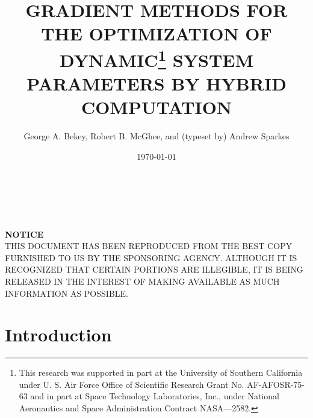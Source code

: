 \documentclass[12pt,reqno]{article}
\title{\textbf{GRADIENT METHODS FOR THE OPTIMIZATION OF DYNAMIC\footnote{This research was supported in part at the University of Southern California under U. S. Air Force Office of Scientific Research Grant No. AF-AFOSR-75-63 and in part at Space Technology Laboratories, Inc., under National Aeronautics and Space Administration Contract NASA—2582.} SYSTEM PARAMETERS BY HYBRID COMPUTATION}} %
\author{George A. Bekey, Robert B. McGhee, and (typeset by) Andrew Sparkes}
\date{\today} %
\begin{document}


\thispagestyle{empty}
\makeatletter
\begin{titlepage}
    \vspace*{\fill}
        \begin{center}
            \@title\\
            \@author\\
            \@date
        \end{center}
    \vspace*{\fill}
\end{titlepage}
\makeatother

\newpage
\thispagestyle{empty}
\begin{center}
\topskip 0pt
\vspace*{\fill}
\Large
\textbf{NOTICE} \\
\normalsize
THIS DOCUMENT HAS BEEN REPRODUCED FROM THE BEST COPY FURNISHED TO US BY THE SPONSORING AGENCY. ALTHOUGH IT IS RECOGNIZED THAT CERTAIN PORTIONS ARE ILLEGIBLE, IT IS BEING RELEASED IN THE INTEREST OF MAKING AVAILABLE AS MUCH INFORMATION AS POSSIBLE.
\vspace*{\fill}
\end{center}

\newpage
\pagestyle{fancy}
\fancyhead[LE, LO]{} %
\fancyhead[RE, RO]{} %



\section{Introduction}

\lipsum[3] %
\cite{Graupe1961}
\cite{Potts1961}

\cite{Potts1961}
\cite{Potts1961}

\cite{Potts1961}
\cite{Potts1961}

\cite{Potts1961}
\cite{Potts1961}

\cite{Potts1961}
\cite{Potts1961}
\end{document}
